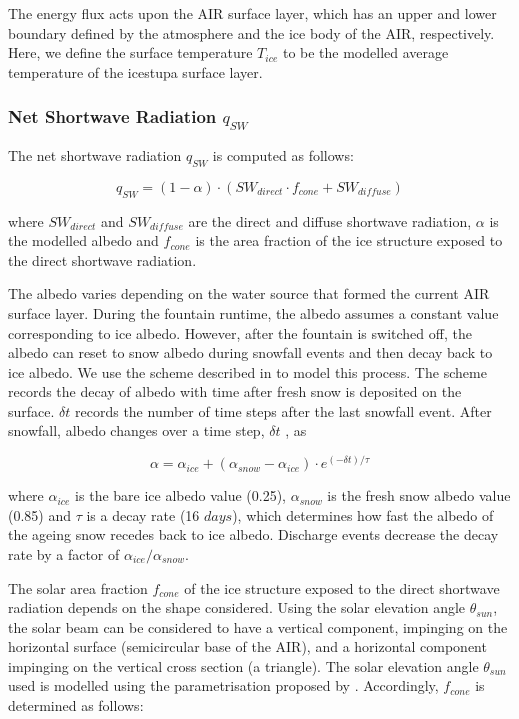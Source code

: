 The energy flux acts upon the AIR surface layer, which has an upper and lower boundary defined by the atmosphere
and the ice body of the AIR, respectively. Here, we define the surface temperature $T_{ice}$ to be the modelled
average temperature of the icestupa surface layer.

\subsubsection{Net Shortwave Radiation \texorpdfstring{$q_{SW}$}{Lg}} \label{sec:SW}

The net shortwave radiation $q_{SW}$ is computed as follows:

\begin{equation} q_{SW} = (1- \alpha)\cdot (SW_{direct} \cdot f_{cone} + SW_{diffuse}) \label{eqn:SW} \end{equation}

where $SW_{direct}$ and $SW_{diffuse}$ are the direct and diffuse shortwave radiation, $\alpha$ is the
modelled albedo and $f_{cone}$ is the area fraction of the ice structure exposed to the direct shortwave
radiation.

The albedo varies depending on the water source that formed the current AIR surface layer. During the fountain
runtime, the albedo assumes a constant value corresponding to ice albedo. However, after the fountain is
switched off, the albedo can reset to snow albedo during snowfall events and then decay back to ice albedo. We
use the scheme described in \cite{oerlemansYearRecordGlobal1998} to model this process. The scheme records the
decay of albedo with time after fresh snow is deposited on the surface. $\delta t$ records the number of time
steps after the last snowfall event. After snowfall, albedo changes over a time step, $\delta t$ , as

\begin{equation} \alpha=\alpha_{ice}+(\alpha_{snow}-\alpha_{ice}) \cdot e^{(-\delta t)/\tau} \label{eqn:alb}
\end{equation}

where $\alpha_{ice}$ is the bare ice albedo value (0.25), $\alpha_{snow}$ is the fresh snow albedo value (0.85)
and $\tau$ is a decay rate (16 $days$), which determines how fast the albedo of the ageing snow recedes back to
ice albedo. Discharge events decrease the decay rate by a factor of $\alpha_{ice}/\alpha_{snow}$. 

The solar area fraction $f_{cone}$ of the ice structure exposed to the direct shortwave radiation depends on the shape
considered. Using the solar elevation angle $\theta_{sun}$, the solar beam can be considered to have a vertical
component, impinging on the horizontal surface (semicircular base of the AIR), and a horizontal component
impinging on the vertical cross section (a triangle). The solar elevation angle $\theta_{sun}$ used is modelled
using the parametrisation proposed by \cite{woolfComputationSolarElevation1968}. Accordingly, $f_{cone}$ is determined as follows:

